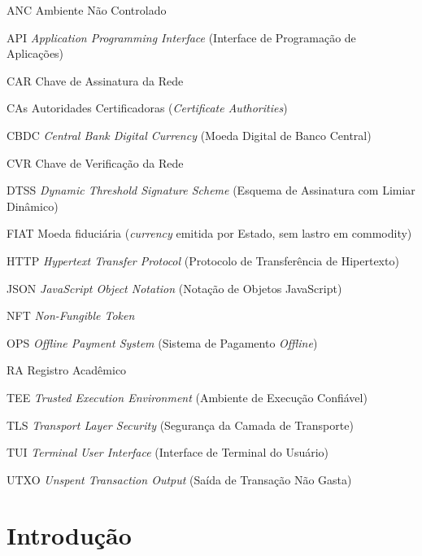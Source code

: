 \documentclass[
  12pt,
  a4paper,
  oneside,
  article,
]{abntex2}
\begin{document}
\begin{siglas}
	\item[ANC] Ambiente Não Controlado
	\item[API] \textit{Application Programming Interface} (Interface de Programação de Aplicações)
	\item[CAR] Chave de Assinatura da Rede
	\item[CAs] Autoridades Certificadoras (\textit{Certificate Authorities})
	\item[CBDC] \textit{Central Bank Digital Currency} (Moeda Digital de Banco Central)
	\item[CVR] Chave de Verificação da Rede
	\item[DTSS] \textit{Dynamic Threshold Signature Scheme} (Esquema de Assinatura com Limiar Dinâmico)
	\item[FIAT] Moeda fiduciária (\textit{currency} emitida por Estado, sem lastro em commodity)
	\item[HTTP] \textit{Hypertext Transfer Protocol} (Protocolo de Transferência de Hipertexto)
	\item[JSON] \textit{JavaScript Object Notation} (Notação de Objetos JavaScript)
	\item[NFT] \textit{Non-Fungible Token}
	\item[OPS] \textit{Offline Payment System} (Sistema de Pagamento \textit{Offline})
	\item[RA] Registro Acadêmico
	\item[TEE] \textit{Trusted Execution Environment} (Ambiente de Execução Confiável)
	\item[TLS] \textit{Transport Layer Security} (Segurança da Camada de Transporte)
	\item[TUI] \textit{Terminal User Interface} (Interface de Terminal do Usuário)
	\item[UTXO] \textit{Unspent Transaction Output} (Saída de Transação Não Gasta)
\end{siglas}

\renewcommand{\contentsname}{SUMÁRIO}
\tableofcontents*
\cleardoublepage

\textual
\pagestyle{abntpaginacao}

\section{Introdução}
\end{document}
